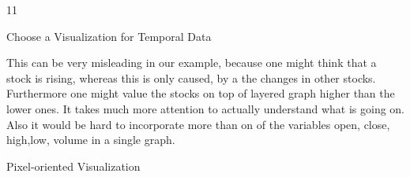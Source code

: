 \documentclass{article}
\begin{document}
\begin{ukon-infie}[31.01.18]{11}
\begin{exercise}[p=7]{Choose a Visualization for Temporal Data}
{			This can be very misleading in our example, because one might think that a stock is rising, whereas this is only caused, by a the changes in other stocks. Furthermore one might value the stocks on top of layered graph higher than the lower ones. It takes much more attention to actually understand what is going on. Also it would be hard to incorporate more than on of the variables open, close, high,low, volume in a single graph.
			
			
		}
		\end{exercise}
		
		\begin{exercise}[p=4]{Pixel-oriented Visualization}
		
		\end{exercise}
		
		
\end{ukon-infie}
\end{document}
